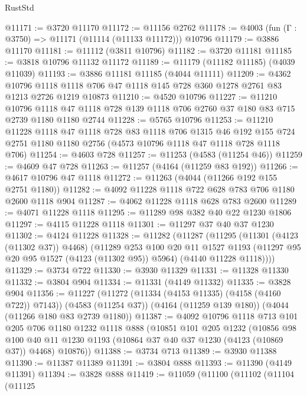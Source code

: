 \begin{lexlean}{RustStd}
\begin{coremodule}
@11171 := @3720 @11170
@11172 := @11156 @2762
@11178 := @4003 (fun (Γ : @3750) => @11171 (@11114 (@11133 @11172))) @10796
@11179 := @3886 @11170
@11181 := @11112 (@3811 @10796)
@11182 := @3720 @11181
@11185 := @3818 @10796 @11132 @11172
@11189 := @11179 (@11182 @11185) (@4039 @11039)
@11193 := @3886 @11181 @11185 (@4044 @11111)
@11209 := @4362
    @10796
    @1118
    @1118
    @706
    @47
    @1118
    @145
    @728
    @360
    @1278
    @2761
    @83
    @1213
    @2726
    @1219
    @10873
@11210 := @4520 @10796
@11227 := @11210
    @10796
    @1118
    @47
    @1118
    @728
    @139
    @1118
    @706
    @2760
    @37
    @180
    @83
    @715
    @2739
    @1180
    @1180
    @2744
@11228 := @5765 @10796
@11253 := @11210
    @11228
    @1118
    @47
    @1118
    @728
    @83
    @1118
    @706
    @1315
    @46
    @192
    @155
    @724
    @2751
    @1180
    @1180
    @2756
    (@4573 @10796 @1118 @47 @1118 @728 @1118 @706)
@11254 := @4603 @728
@11257 := @11253 (@4583 (@11254 @46))
@11259 := @4609 @47 @728
@11263 := @11257 (@4164 (@11259 @83 @192))
@11266 := @4617 @10796 @47 @1118
@11272 := @11263 (@4044 (@11266 @192 @155 @2751 @1180))
@11282 := @4092 @11228 @1118 @722 @628 @783 @706 @1180 @2600 @1118 @904
@11287 := @4062 @11228 @1118 @628 @783 @2600
@11289 := @4071 @11228 @1118
@11295 := @11289 @98 @382 @40 @22 @1230 @1806
@11297 := @4115 @11228 @1118
@11301 := @11297 @37 @40 @37 @1230
@11302 := @4124 @11228
@11328 := @11282
    (@11287
      (@11295
        (@11301 (@4123 (@11302 @37)) @4468)
        (@11289
          @253
          @100
          @20
          @11
          @1527
          @1193
          (@11297 @95 @20 @95 @1527 (@4123 (@11302 @95)) @5964)
          (@4140 @11228 @1118))))
@11329 := @3734 @722
@11330 := @3930 @11329
@11331 := @11328 @11330
@11332 := @3804 @904
@11334 := @11331 (@4149 @11332)
@11335 := @3828 @904
@11356 := @11227
    (@11272 (@11334 (@4153 @11335) (@4158 (@4160 @722)) @7143))
    (@4583 (@11254 @37))
    (@4164 (@11259 @139 @180))
    (@4044 (@11266 @180 @83 @2739 @1180))
@11387 := @4092
    @10796
    @1118
    @713
    @101
    @205
    @706
    @1180
    @1232
    @1118
    @888
    (@10851
      @101
      @205
      @1232
      (@10856
        @98
        @100
        @40
        @11
        @1230
        @1193
        (@10864 @37 @40 @37 @1230 (@4123 (@10869 @37)) @4468)
        @10876))
@11388 := @3734 @713
@11389 := @3930 @11388
@11390 := @11387 @11389
@11391 := @3804 @888
@11393 := @11390 (@4149 @11391)
@11394 := @3828 @888
@11419 := @11059
    (@11100
      (@11102
        (@11104
          (@11125

\end{coremodule}
\end{lexlean}
